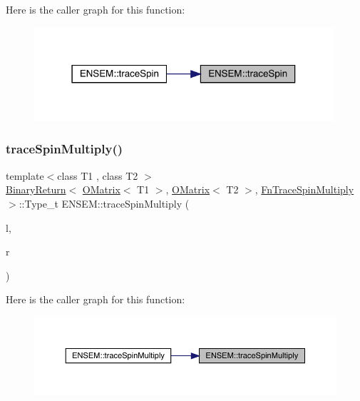 Here is the caller graph for this function\+:\nopagebreak
\begin{figure}[H]
\begin{center}
\leavevmode
\includegraphics[width=315pt]{d8/d55/group__obsmatrix_gae311225b718ade4433fe82a01a290d63_icgraph}
\end{center}
\end{figure}
\mbox{\label{group__obsmatrix_gabff96ae04e02659ddc78f25a8d61bf61}} 
\subsubsection{\texorpdfstring{traceSpinMultiply()}{traceSpinMultiply()}\hspace{0.1cm}{\footnotesize\ttfamily [1/3]}}
{\footnotesize\ttfamily template$<$class T1 , class T2 $>$ \\
\mbox{\hyperlink{structENSEM_1_1BinaryReturn}{Binary\+Return}}$<$ \mbox{\hyperlink{classENSEM_1_1OMatrix}{O\+Matrix}}$<$ T1 $>$, \mbox{\hyperlink{classENSEM_1_1OMatrix}{O\+Matrix}}$<$ T2 $>$, \mbox{\hyperlink{structENSEM_1_1FnTraceSpinMultiply}{Fn\+Trace\+Spin\+Multiply}} $>$\+::Type\+\_\+t E\+N\+S\+E\+M\+::trace\+Spin\+Multiply (\begin{DoxyParamCaption}\item[{const \mbox{\hyperlink{classENSEM_1_1OMatrix}{O\+Matrix}}$<$ T1 $>$ \&}]{l,  }\item[{const \mbox{\hyperlink{classENSEM_1_1OMatrix}{O\+Matrix}}$<$ T2 $>$ \&}]{r }\end{DoxyParamCaption})\hspace{0.3cm}{\ttfamily [inline]}}

Here is the caller graph for this function\+:\nopagebreak
\begin{figure}[H]
\begin{center}
\leavevmode
\includegraphics[width=350pt]{d8/d55/group__obsmatrix_gabff96ae04e02659ddc78f25a8d61bf61_icgraph}
\end{center}
\end{figure}
\mbox{\label{group__obsmatrix_gaff573e35e3b3904f735317f67cae28f6}} 
